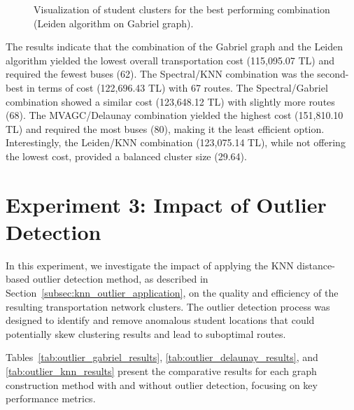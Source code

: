 \begin{figure}[h]
    \centering
    \caption{Visualization of student clusters for the best performing combination (Leiden algorithm on Gabriel graph).}
    \label{fig:best_clustering_viz}
\end{figure}

The results indicate that the combination of the Gabriel graph and the Leiden algorithm yielded the lowest overall transportation cost (115,095.07 TL) and required the fewest buses (62). The Spectral/KNN combination was the second-best in terms of cost (122,696.43 TL) with 67 routes. The Spectral/Gabriel combination showed a similar cost (123,648.12 TL) with slightly more routes (68). The MVAGC/Delaunay combination yielded the highest cost (151,810.10 TL) and required the most buses (80), making it the least efficient option. Interestingly, the Leiden/KNN combination (123,075.14 TL), while not offering the lowest cost, provided a balanced cluster size (29.64).

\section{Experiment 3: Impact of Outlier Detection}
\label{sec:exp_outlier}

In this experiment, we investigate the impact of applying the KNN distance-based outlier detection method, as described in Section~\ref{subsec:knn_outlier_application}, on the quality and efficiency of the resulting transportation network clusters. The outlier detection process was designed to identify and remove anomalous student locations that could potentially skew clustering results and lead to suboptimal routes.


Tables~\ref{tab:outlier_gabriel_results}, \ref{tab:outlier_delaunay_results}, and \ref{tab:outlier_knn_results} present the comparative results for each graph construction method with and without outlier detection, focusing on key performance metrics.


